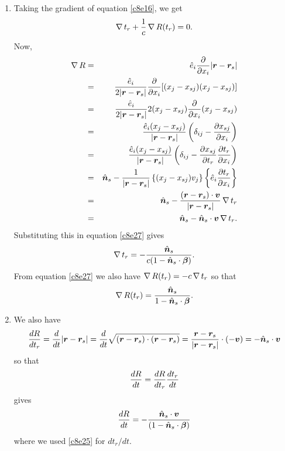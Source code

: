 \begin{enumerate}
\item Taking the gradient of equation \eqref{c8e16}, we get
\begin{equation}\label{c8e27}
\operatorname{\nabla} t_r + \frac{1}{c}\operatorname{\nabla} R(t_r) = 0.
\end{equation}
Now,
\begin{eqnarray*}
\operatorname{\nabla} R &=& \hat{e}_i\frac{\partial}{\partial x_i}|\bm{r} - \bm{r}_s| \\
 &=& \frac{\hat{e}_i}{2|\bm{r}-\bm{r}_s|}\frac{\partial}{\partial x_i}
 [(x_j - x_{sj})(x_j - x_{sj})] \\
 &=& \frac{\hat{e}_i}{2|\bm{r}-\bm{r}_s|}2(x_j - x_{sj})
 \frac{\partial}{\partial x_i}(x_j - x_{sj}) \\
 &=& \frac{\hat{e}_i(x_j - x_{sj})}{|\bm{r}-\bm{r}_s|}\left(\delta_{ij} - 
 \frac{\partial{x_{sj}}}{\partial{x_i}}\right) \\
 &=& \frac{\hat{e}_i(x_j - x_{sj})}{|\bm{r}-\bm{r}_s|}\left(\delta_{ij} - 
 \frac{\partial{x_{sj}}}{\partial{t_r}}\frac{\partial{t_r}}{\partial{x_i}}\right) \\
 &=& \hat{\bm{n}}_s - \frac{1}{|\bm{r} - \bm{r}_s|}\left\{(x_j - x_{sj})v_j\right\}
 \left\{\hat{e}_i\frac{\partial{t_r}}{\partial{x_i}}\right\} \\
 &=& \hat{\bm{n}}_s - \frac{(\bm{r} - \bm{r}_s)\cdot\bm{v}}{|\bm{r} - \bm{r}_s|}
 \operatorname{\nabla} t_r \\
 &=& \hat{\bm{n}}_s - \hat{\bm{n}}_s\cdot\bm{v} \operatorname{\nabla} t_r.
\end{eqnarray*}
Substituting this in equation \eqref{c8e27} gives
\begin{equation}\label{c8e28}
\operatorname{\nabla} t_r = -\frac{\hat{\bm{n}}_s}{c(1 - \hat{\bm{n}}_s\cdot\bm{\beta})}.
\end{equation}
From equation \eqref{c8e27} we also have $\operatorname{\nabla} R(t_r) = -c\operatorname{\nabla} t_r$ so that
\begin{equation}\label{c8e29}
\operatorname{\nabla} R(t_r) = \frac{\hat{\bm{n}}_s}{1 - \hat{\bm{n}}_s\cdot\bm{\beta}}.
\end{equation}


\item We also have
\[
\frac{d{R}}{d{t_r}} = \frac{d}{dt}|\bm{r} - \bm{r}_s| = 
\frac{d}{dt}\sqrt{(\bm{r} - \bm{r}_s)\cdot(\bm{r} - \bm{r}_s)}
= \frac{\bm{r} - \bm{r}_s}{|\bm{r} - \bm{r}_s|}\cdot(-\bm{v})
= -\hat{\bm{n}}_s\cdot\bm{v}
\]
so that
\[
\frac{d{R}}{d{t}} = \frac{d{R}}{d{t_r}}\frac{d{t_r}}{d{t}}
\]
gives
\begin{equation}\label{c8e30}
\frac{d{R}}{d{t}} = -\frac{\hat{\bm{n}}_s\cdot\bm{v}}{(1 - \hat{\bm{n}}_s\cdot\bm{\beta})}
\end{equation}
where we used \eqref{c8e25} for $dt_r/dt$.
\end{enumerate}

